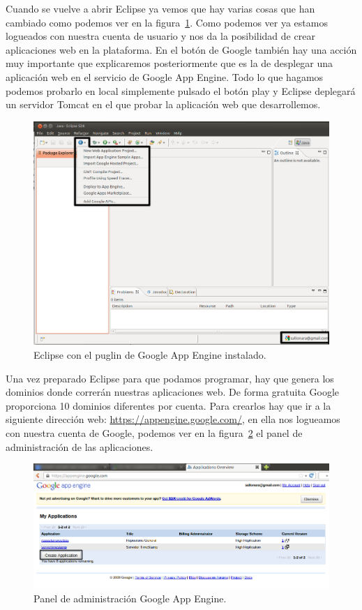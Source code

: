 Cuando se vuelve a abrir Eclipse ya vemos que hay varias cosas que han cambiado como podemos ver en la figura~\ref{fig:eclipseGAE}. Como podemos ver ya estamos logueados con nuestra cuenta de usuario y nos da la posibilidad de crear aplicaciones web en la plataforma. En el botón de Google también hay una acción muy importante que explicaremos posteriormente que es la de desplegar una aplicación web en el servicio de Google App Engine. Todo lo que hagamos podemos probarlo en local simplemente pulsado el botón play y Eclipse deplegará un servidor Tomcat en el que probar la aplicación web que desarrollemos.

\begin{figure}
  \centering
    \includegraphics[scale=0.6]{./ConfiguracionEclipse/imagenes/eclipseGAE.png}
  \caption{Eclipse con el puglin de Google App Engine instalado.}
  \label{fig:eclipseGAE}
\end{figure}

Una vez preparado Eclipse para que podamos programar, hay que genera los dominios donde correrán nuestras aplicaciones web. De forma gratuita Google proporciona 10 dominios diferentes por cuenta. Para crearlos hay que ir a la siguiente dirección web: \url{https://appengine.google.com/}, en ella nos logueamos con nuestra cuenta de Google, podemos ver en la figura~\ref{fig:appEngine} el panel de administración de las aplicaciones.  

\begin{figure}
  \centering
    \includegraphics[scale=0.6]{./ConfiguracionEclipse/imagenes/appEngine.png}
  \caption{Panel de administración Google App Engine.}
  \label{fig:appEngine}
\end{figure}

